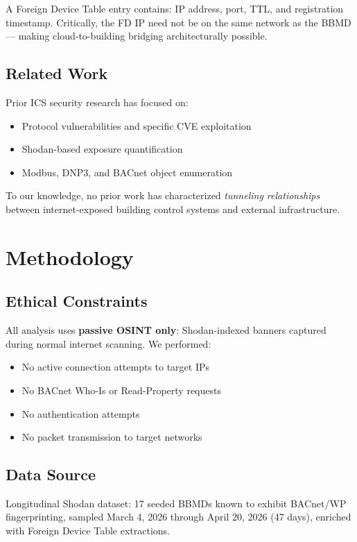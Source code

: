 \documentclass[11pt,a4paper]{article}
\begin{document}
A Foreign Device Table entry contains: IP address, port, TTL, and registration 
timestamp. Critically, the FD IP need not be on the same network as the BBMD---
making cloud-to-building bridging architecturally possible.

\subsection{Related Work}

Prior ICS security research has focused on:
\begin{itemize}
  \item Protocol vulnerabilities and specific CVE exploitation\cite{bradley2020industrial}
  \item Shodan-based exposure quantification\cite{tank2017sok,shodanics}
  \item Modbus, DNP3, and BACnet object enumeration\cite{gamage2018security}
\end{itemize}

To our knowledge, no prior work has characterized \emph{tunneling relationships}
between internet-exposed building control systems and external infrastructure.

\section{Methodology}
\label{sec:methodology}

\subsection{Ethical Constraints}

All analysis uses \textbf{passive OSINT only}: Shodan-indexed banners captured 
during normal internet scanning\cite{shodanics}. We performed:
\begin{itemize}
  \item No active connection attempts to target IPs
  \item No BACnet Who-Is or Read-Property requests
  \item No authentication attempts
  \item No packet transmission to target networks
\end{itemize}

\subsection{Data Source}

Longitudinal Shodan dataset: 17 seeded BBMDs known to exhibit BACnet/WP 
fingerprinting, sampled March 4, 2026 through April 20, 2026 (47 days), 
enriched with Foreign Device Table extractions.
\end{document}
